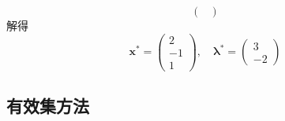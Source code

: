 \begin{example}
\begin{solution}
\[\begin{pmatrix}
                \end{pmatrix}
            \]
            解得
            \[
                \boldsymbol{x}^{*}=
                \begin{pmatrix}
                    {2}\\{-1}\\{1}
                \end{pmatrix}
                ,\quad\boldsymbol{\lambda}^{*}=
                \begin{pmatrix}
                    {3}\\{-2}
                \end{pmatrix}
            \]
    \end{solution}
\end{example}
\subsection{有效集方法}
